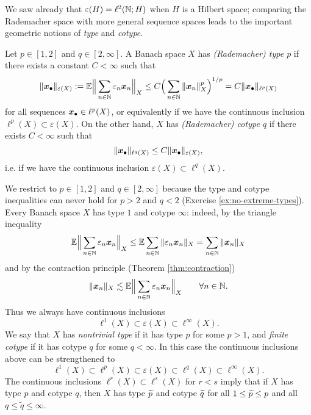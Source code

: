 We saw already that $\varepsilon(H) = \ell^2(\mathbb{N};H)$ when $H$ is a Hilbert space; comparing the Rademacher space with more general sequence spaces leads to the important geometric notions of \emph{type} and \emph{cotype}.

\begin{defn}
  Let $p \in [1,2]$ and $q \in [2,\infty]$.
  A Banach space $X$ has \emph{(Rademacher) type $p$} if there exists a constant $C < \infty$ such that
  \begin{equation*}
    \| \bm{x}_{\bullet} \|_{\varepsilon(X)} := \mathbb{E} \Big\| \sum_{n \in \mathbb{N}} \varepsilon_{n} \bm{x}_{n} \Big\|_{X} \leq C \Big( \sum_{n \in \mathbb{N}} \|\bm{x}_{n}\|_{X}^{p} \Big)^{1/p} = C\|\bm{x}_{\bullet}\|_{\ell^p(X)}
  \end{equation*}
  for all sequences $\bm{x}_{\bullet} \in \ell^{p}(X)$, or equivalently if we have the continuous inclusion $\ell^{p}(X) \subset \varepsilon(X)$.
  On the other hand, $X$ has \emph{(Rademacher) cotype $q$} if there exists $C < \infty$ such that
  \begin{equation*}
    \|\bm{x}_{\bullet}\|_{\ell^q(X)} \leq C \|\bm{x}_{\bullet}\|_{\varepsilon(X)} ,
  \end{equation*}
  i.e. if we have the continuous inclusion $\varepsilon(X) \subset \ell^{q}(X)$.
\end{defn}

We restrict to $p \in [1,2]$ and $q \in [2,\infty]$ because the type and cotype inequalities can never hold for $p > 2$ and $q < 2$ (Exercise \ref{ex:no-extreme-types}).
Every Banach space $X$ has type $1$ and cotype $\infty$: indeed, by the triangle inequality
\begin{equation*}
  \mathbb{E} \Big\| \sum_{n \in \mathbb{N}} \varepsilon_{n} \bm{x}_{n} \Big\|_{X} \leq \mathbb{E} \sum_{n \in \mathbb{N}} \|\varepsilon_{n} \bm{x}_{n}\|_{X} = \sum_{n \in \mathbb{N}} \|\bm{x}_{n}\|_{X}
\end{equation*}
and by the contraction principle (Theorem \ref{thm:contraction})
\begin{equation*}
  \|\bm{x}_{n}\|_{X} \lesssim \mathbb{E} \Big\| \sum_{n \in \mathbb{N}} \varepsilon_{n} \bm{x}_{n}\Big\|_{X} \qquad \forall n \in \mathbb{N}.
\end{equation*}
Thus we always have continuous inclusions
\begin{equation*}
  \ell^1(X)\subset  \varepsilon(X) \subset \ell^{\infty}(X).
\end{equation*}
We say that $X$ has \emph{nontrivial type} if it has type $p$ for some $p > 1$, and \emph{finite cotype} if it has cotype $q$ for some $q < \infty$.
In this case the continuous inclusions above can be strengthened to
\begin{equation*}
  \ell^1(X)\subset \ell^p(X) \subset \varepsilon(X) \subset \ell^{q}(X) \subset \ell^{\infty}(X).
\end{equation*}
The continuous inclusions $\ell^{r}(X) \subset \ell^{s}(X)$ for $r < s$ imply that if $X$ has type $p$ and cotype $q$, then $X$ has type $\widetilde{p}$ and cotype $\widetilde{q}$ for all $1 \leq \widetilde{p} \leq p$ and all $q \leq \tilde{q} \leq \infty$.

